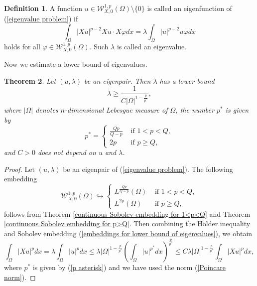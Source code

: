 \documentclass[a4paper,12pt,reqno]{amsart}
\renewcommand\eqref[1]{(\ref{#1})} %
\numberwithin{equation}{section}
\theoremstyle{plain}
\newtheorem{theorem}{Theorem}[section]
\theoremstyle{definition}
\newtheorem{definition}[theorem]{Definition}
\begin{document}
\begin{definition}\label{def:eigenfunction}
A  function $u \in \mathcal{W}_{X,0}^{1, p}(\Omega)\setminus \{0\}$ is called an eigenfunction of  \eqref{eigenvalue problem} if
\begin{equation}\label{eigenfunction}
\int_{\Omega}|X u|^{p-2} Xu \cdot X \varphi d x=\lambda \int_{\Omega}|u|^{p-2} u \varphi d x
\end{equation}
holds for all $\varphi\in \mathcal{W}_{X,0}^{1, p}(\Omega)$. Such $\lambda$ is called an eigenvalue.
\end{definition}
Now we estimate a lower bound of eigenvalues.
\begin{theorem} \label{lower bound lemma}
Let $(u, \lambda)$ be an eigenpair. Then $\lambda$ has a lower bound
\begin{equation*}
\lambda \geq  \frac{1}{C|\Omega|^{1-\frac{p}{p^{*}}}}, 
\end{equation*}
where $|\Omega|$ denotes $n$-dimensional Lebesgue measure of $\Omega$, the number $p^{*}$ is given by  
\begin{equation}\label{p asterisk}
p^{*}=\begin{cases}
\frac{Qp}{Q-p}& \text{ if } 1<p<Q,\\
2p& \text{ if } p\geq Q,
\end{cases}
\end{equation}
and $C>0$ does not depend on  $u$ and  $\lambda$.
\end{theorem}
\begin{proof}
Let $(u,\lambda)$ be an eigenpair of  \eqref{eigenvalue problem}. The following  embedding
\begin{equation}\label{embeddings for lower bound of eigenvalues}
\mathcal{W}_{X,0}^{1, p}(\Omega)\hookrightarrow\begin{cases}
L^{\frac{Qp}{Q-p}}(\Omega) & \text{ if } 1<p<Q,\\
L^{2p}(\Omega) & \text{ if } p\geq Q,
\end{cases}
\end{equation}
follows from Theorem \ref{continuous Sobolev embedding for 1<p<Q} and Theorem \ref{continuous Sobolev embedding for p>Q}. Then combining the H\"older inequality and  Sobolev embedding \eqref{embeddings for lower bound of eigenvalues}, we obtain
\begin{equation*}
\int_{\Omega}|X u|^{p} d x= \lambda\int_{\Omega}|u|^{p} d x\leq \lambda|\Omega|^{1-\frac{p}{p^{*}}}\left(\int_{\Omega}|u|^{p^{*}}dx\right)^{\frac{p}{p^{*}}}\leq C\lambda|\Omega|^{1-\frac{p}{p^{*}}}\int_{\Omega}|X u|^{p} d x ,
\end{equation*}
where $p^{*}$ is given by \eqref{p asterisk} and we have used the norm \eqref{Poincare norm}.
\end{proof}
\end{document}
